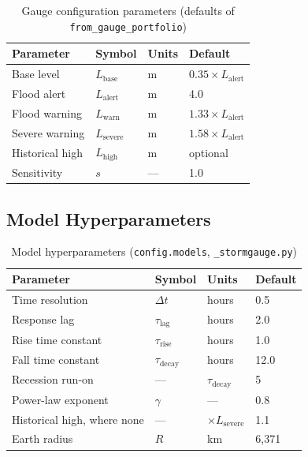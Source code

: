 \documentclass[11pt,a4paper]{article}
\begin{document}
\begin{table}[H]
    \centering
    \caption{Gauge configuration parameters (defaults of \texttt{from\_gauge\_portfolio})}
    \label{tab:gauge_params}
    \begin{tabular}{llll}
        \toprule
        \textbf{Parameter} & \textbf{Symbol} & \textbf{Units} & \textbf{Default} \\
        \midrule
        Base level & $L_{\text{base}}$ & m & $0.35 \times L_{\text{alert}}$ \\
        Flood alert & $L_{\text{alert}}$ & m & 4.0 \\
        Flood warning & $L_{\text{warn}}$ & m & $1.33 \times L_{\text{alert}}$ \\
        Severe warning & $L_{\text{severe}}$ & m & $1.58 \times L_{\text{alert}}$ \\
        Historical high & $L_{\text{high}}$ & m & optional \\
        Sensitivity & $s$ & --- & 1.0 \\
        \bottomrule
    \end{tabular}
\end{table}

\subsection{Model Hyperparameters}

\begin{table}[H]
    \centering
    \caption{Model hyperparameters (\texttt{config.models}, \texttt{\_stormgauge.py})}
    \label{tab:model_params}
    \begin{tabular}{llll}
        \toprule
        \textbf{Parameter} & \textbf{Symbol} & \textbf{Units} & \textbf{Default} \\
        \midrule
        Time resolution & $\Delta t$ & hours & 0.5 \\
        Response lag & $\tau_{\text{lag}}$ & hours & 2.0 \\
        Rise time constant & $\tau_{\text{rise}}$ & hours & 1.0 \\
        Fall time constant & $\tau_{\text{decay}}$ & hours & 12.0 \\
        Recession run-on & --- & $\tau_{\text{decay}}$ & 5 \\
        Power-law exponent & $\gamma$ & --- & 0.8 \\
        Historical high, where none & --- & $\times L_{\text{severe}}$ & 1.1 \\
        Earth radius & $R$ & km & 6{,}371 \\
        \bottomrule
    \end{tabular}
\end{table}
\end{document}

